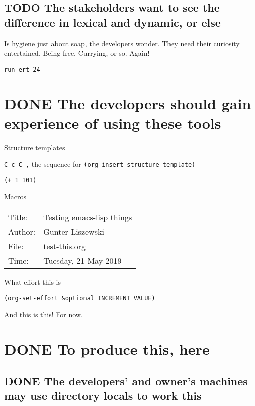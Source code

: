 \documentclass[11pt]{article}
\begin{document}
\subsection*{{\bfseries\sffamily TODO} The stakeholders want to see the difference in lexical and dynamic, or else}
\label{sec:org3f6c1b0}
Is hygiene just about soap, the developers wonder.
They need their curiosity entertained.
Being free. Currying, or so. Again!

\begin{verbatim}
run-ert-24
\end{verbatim}

\section*{{\bfseries\sffamily DONE} The developers should gain experience of using these tools}
\label{sec:orgb087038}
Structure templates

\texttt{C-c C-,} the sequence for \texttt{(org-insert-structure-template)}
\begin{verbatim}
(+ 1 101)
\end{verbatim}

Macros

\begin{center}
\begin{tabular}{ll}
\hline
Title: & Testing emacs-lisp things\\
Author: & Gunter Liszewski\\
\hline
File: & test-this.org\\
Time: & Tuesday, 21 May 2019\\
\hline
\end{tabular}
\end{center}

What effort this is

\begin{verbatim}
(org-set-effort &optional INCREMENT VALUE)
\end{verbatim}

And this is this! For now.

\section*{{\bfseries\sffamily DONE} To produce this, here}
\label{sec:org3070956}
\subsection*{{\bfseries\sffamily DONE} The developers' and owner's machines may use directory locals to work this}
\label{sec:orgd11dca9}
\end{document}
